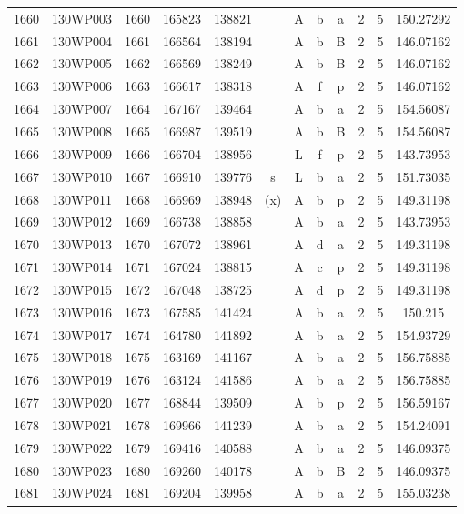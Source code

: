 \begin{tabular}{|*{12}{c|}}
1660 & 130WP003 & 1660 & 165823 & 138821 &  & A & b & a & 2 & 5 & 150.27292 \\ 
1661 & 130WP004 & 1661 & 166564 & 138194 &  & A & b & B & 2 & 5 & 146.07162 \\ 
1662 & 130WP005 & 1662 & 166569 & 138249 &  & A & b & B & 2 & 5 & 146.07162 \\ 
1663 & 130WP006 & 1663 & 166617 & 138318 &  & A & f & p & 2 & 5 & 146.07162 \\ 
1664 & 130WP007 & 1664 & 167167 & 139464 &  & A & b & a & 2 & 5 & 154.56087 \\ 
1665 & 130WP008 & 1665 & 166987 & 139519 &  & A & b & B & 2 & 5 & 154.56087 \\ 
1666 & 130WP009 & 1666 & 166704 & 138956 &  & L & f & p & 2 & 5 & 143.73953 \\ 
1667 & 130WP010 & 1667 & 166910 & 139776 & s & L & b & a & 2 & 5 & 151.73035 \\ 
1668 & 130WP011 & 1668 & 166969 & 138948 & (x) & A & b & p & 2 & 5 & 149.31198 \\ 
1669 & 130WP012 & 1669 & 166738 & 138858 &  & A & b & a & 2 & 5 & 143.73953 \\ 
1670 & 130WP013 & 1670 & 167072 & 138961 &  & A & d & a & 2 & 5 & 149.31198 \\ 
1671 & 130WP014 & 1671 & 167024 & 138815 &  & A & c & p & 2 & 5 & 149.31198 \\ 
1672 & 130WP015 & 1672 & 167048 & 138725 &  & A & d & p & 2 & 5 & 149.31198 \\ 
1673 & 130WP016 & 1673 & 167585 & 141424 &  & A & b & a & 2 & 5 & 150.215 \\ 
1674 & 130WP017 & 1674 & 164780 & 141892 &  & A & b & a & 2 & 5 & 154.93729 \\ 
1675 & 130WP018 & 1675 & 163169 & 141167 &  & A & b & a & 2 & 5 & 156.75885 \\ 
1676 & 130WP019 & 1676 & 163124 & 141586 &  & A & b & a & 2 & 5 & 156.75885 \\ 
1677 & 130WP020 & 1677 & 168844 & 139509 &  & A & b & p & 2 & 5 & 156.59167 \\ 
1678 & 130WP021 & 1678 & 169966 & 141239 &  & A & b & a & 2 & 5 & 154.24091 \\ 
1679 & 130WP022 & 1679 & 169416 & 140588 &  & A & b & a & 2 & 5 & 146.09375 \\ 
1680 & 130WP023 & 1680 & 169260 & 140178 &  & A & b & B & 2 & 5 & 146.09375 \\ 
1681 & 130WP024 & 1681 & 169204 & 139958 &  & A & b & a & 2 & 5 & 155.03238 \\ 

\end{tabular}
